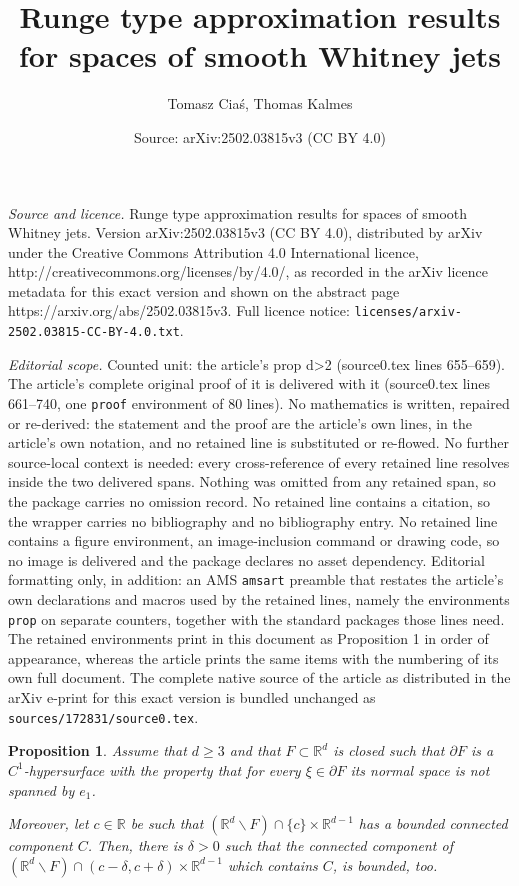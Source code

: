 \documentclass[10pt,a4paper]{amsart}
\title{Runge type approximation results for spaces of smooth Whitney jets}
\author{Tomasz Cia\'s, Thomas Kalmes}
\date{Source: arXiv:2502.03815v3 (CC BY 4.0)}
\newtheorem{prop}{Proposition}
\newcommand{\R}{\mathbb R}
\begin{document}
\maketitle

\noindent\emph{Source and licence.} Runge type approximation results for spaces of smooth Whitney jets. Version arXiv:2502.03815v3 (CC BY 4.0), distributed by arXiv under the Creative Commons Attribution 4.0 International licence, http://creativecommons.org/licenses/by/4.0/, as recorded in the arXiv licence metadata for this exact version and shown on the abstract page https://arxiv.org/abs/2502.03815v3. Full licence notice: \texttt{licenses/arxiv-2502.03815-CC-BY-4.0.txt}.\par\smallskip

\noindent\textit{Editorial scope.} Counted unit: the article's prop d>2 (source0.tex lines 655--659). The article's complete original proof of it is delivered with it (source0.tex lines 661--740, one \texttt{proof} environment of 80 lines). No mathematics is written, repaired or re-derived: the statement and the proof are the article's own lines, in the article's own notation, and no retained line is substituted or re-flowed.  No further source-local context is needed: every cross-reference of every retained line resolves inside the two delivered spans.  Nothing was omitted from any retained span, so the package carries no omission record.  No retained line contains a citation, so the wrapper carries no bibliography and no bibliography entry.  No retained line contains a figure environment, an image-inclusion command or drawing code, so no image is delivered and the package declares no asset dependency.  Editorial formatting only, in addition: an AMS \texttt{amsart} preamble that restates the article's own declarations and macros used by the retained lines, namely the environments \texttt{prop} on separate counters, together with the standard packages those lines need.  The retained environments print in this document as Proposition 1 in order of appearance, whereas the article prints the same items with the numbering of its own full document.  The complete native source of the article as distributed in the arXiv e-print for this exact version is bundled unchanged as \texttt{sources/172831/source0.tex}.
\begin{prop}\label{prop:C1-boundary, d>2}
	Assume that $d\geq 3$ and that $F\subset\R^d$ is closed such that $\partial F$ is a $C^1$-hypersurface with the property that for every $\xi\in \partial F$ its normal space is not spanned by $e_1$. 
	
	Moreover, let $c\in\R$ be such that $\left(\R^d\backslash F\right)\cap \{c\}\times\R^{d-1}$ has a bounded connected component $C$. Then, there is $\delta>0$ such that the connected component of $\left(\R^d\backslash F\right)\cap (c-\delta,c+\delta)\times\R^{d-1}$ which contains $C$, is bounded, too. 
\end{prop}
\end{document}
